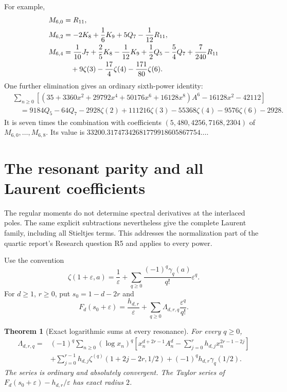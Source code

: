 \documentclass[11pt,a4paper]{article}
\numberwithin{equation}{section}
\newtheorem{theorem}{Theorem}[section]
\theoremstyle{definition}
\theoremstyle{remark}
\begin{document}
For example,
\begin{align}
 M_{6,0}&=R_{11},\notag\\
 M_{6,2}&=-2K_8+\frac16K_9+5Q_7-\frac1{12}R_{11},\notag\\
 M_{6,4}&=\frac1{10}J_7+\frac25K_8-\frac1{12}K_9
       +\frac12Q_5-\frac54Q_7+\frac7{240}R_{11}\notag\\
       &\quad+9\zeta(3)-\frac{17}{4}\zeta(4)
                       -\frac{171}{80}\zeta(6).
                       \label{tp:eq:M6examples}
\end{align}
One further elimination gives an ordinary sixth-power identity:
\begin{equation}\label{tp:eq:main6}
 \begin{split}
 &\sum_{n\geq0}\left[
 (35+3360x^2+29792x^4+50176x^6+16128x^8)A^6
                    -16128x^2-42112\right]\\
 &\quad=9184Q_5-64Q_7-2928\zeta(2)+111216\zeta(3)
          -55368\zeta(4)-9576\zeta(6)-2928.
 \end{split}
\end{equation}
It is seven times the combination with coefficients
$(5,480,4256,7168,2304)$ of $M_{6,0},\ldots,M_{6,8}$.
Its value is $33200.31747342681779918605867754\ldots$.

\section{The resonant parity and all Laurent coefficients}
\label{tp:sec:resonance}

The regular moments do not determine spectral derivatives at the
interlaced poles.  The same explicit subtractions nevertheless give
the complete Laurent family, including all Stieltjes terms.  This
addresses the normalization part of the quartic report's Research
question R5 and applies to every power.

Use the convention
\begin{equation}\label{tp:eq:Stieltjes}
 \zeta(1+\varepsilon,a)=\frac1\varepsilon+
   \sum_{q\geq0}\frac{(-1)^q\gamma_q(a)}{q!}\varepsilon^q.
\end{equation}
For $d\geq1$, $r\geq0$, put $s_0=1-d-2r$ and
\[
 F_d(s_0+\varepsilon)=\frac{h_{d,r}}\varepsilon+
                 \sum_{q\geq0}\Lambda_{d,r,q}\frac{\varepsilon^q}{q!}.
\]

\begin{theorem}[Exact logarithmic sums at every resonance]
\label{tp:thm:Laurent}
For every $q\geq0$,
\begin{equation}\label{tp:eq:Laurent}
 \boxed{\begin{aligned}
 \Lambda_{d,r,q}={}&(-1)^q\sum_{n\geq0}(\log x_n)^q
 \left[x_n^{d+2r-1}A_n^d-
       \sum_{j=0}^{r}h_{d,j}x_n^{2r-1-2j}\right]\\
 &+\sum_{j=0}^{r-1}h_{d,j}
        \zeta^{(q)}(1+2j-2r,1/2)
       +(-1)^qh_{d,r}\gamma_q(1/2).
 \end{aligned}}
\end{equation}
The series is ordinary and absolutely convergent.  The Taylor series
of $F_d(s_0+\varepsilon)-h_{d,r}/\varepsilon$ has exact radius $2$.
\end{theorem}
\end{document}

